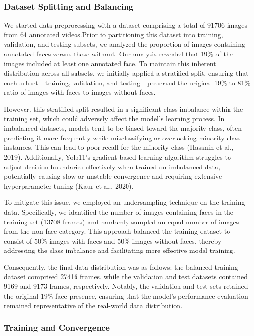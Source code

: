 \documentclass[
  man,floatsintext]{apa6}
\begin{document}
\subsubsection{Dataset Splitting and Balancing}\label{dataset-splitting-and-balancing-1}

We started data preprocessing with a dataset comprising a total of 91706 images from 64 annotated videos.Prior to partitioning this dataset into training, validation, and testing subsets, we analyzed the proportion of images containing annotated faces versus those without. Our analysis revealed that 19\% of the images included at least one annotated face. To maintain this inherent distribution across all subsets, we initially applied a stratified split, ensuring that each subset---training, validation, and testing---preserved the original 19\% to 81\% ratio of images with faces to images without faces.

However, this stratified split resulted in a significant class imbalance within the training set, which could adversely affect the model's learning process. In imbalanced datasets, models tend to be biased toward the majority class, often predicting it more frequently while misclassifying or overlooking minority class instances. This can lead to poor recall for the minority class (Hasanin et al., 2019). Additionally, Yolo11's gradient-based learning algorithm struggles to adjust decision boundaries effectively when trained on imbalanced data, potentially causing slow or unstable convergence and requiring extensive hyperparameter tuning (Kaur et al., 2020).

To mitigate this issue, we employed an undersampling technique on the training data. Specifically, we identified the number of images containing faces in the training set (13708 frames) and randomly sampled an equal number of images from the non-face category. This approach balanced the training dataset to consist of 50\% images with faces and 50\% images without faces, thereby addressing the class imbalance and facilitating more effective model training.

Consequently, the final data distribution was as follows: the balanced training dataset comprised 27416 frames, while the validation and test datasets contained 9169 and 9173 frames, respectively. Notably, the validation and test sets retained the original 19\% face presence, ensuring that the model's performance evaluation remained representative of the real-world data distribution.

\subsubsection{Training and Convergence}\label{training-and-convergence-1}
\end{document}
